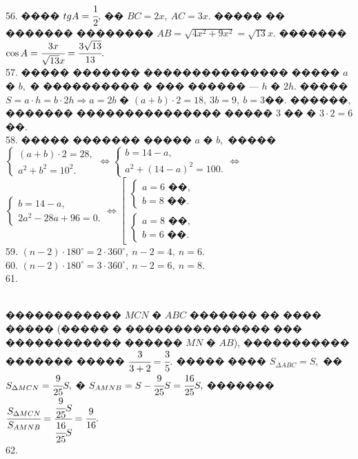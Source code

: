 \documentclass[12pt]{article}
\begin{document}
56. ���� $tg A=\cfrac{1}{2},$ �� $BC=2x,\ AC=3x.$ ����� �� ������� �������� $AB=\sqrt{4x^2+9x^2}=\sqrt{13}x.$ ������� $\cos A=\cfrac{3x}{\sqrt{13}x}=\cfrac{3\sqrt{13}}{13}.$\\
57. ����� ������� ��������������� ����� $a$ � $b,$ � ���������� � ��� ������ --- $h$ � $2h.$ ����� $S=a\cdot h=b\cdot 2h\Rightarrow a=2b$ � $(a+b)\cdot2=18,\ 3b=9,\ b=3$��. ������, ������� ��������������� ����� 3 �� � $3\cdot2=6$��.\\
58. ����� ������� ����� $a$ � $b,$ ����� $\begin{cases}(a+b)\cdot2=28,\\ a^2+b^2=10^2.\end{cases}\Leftrightarrow
\begin{cases}b=14-a,\\ a^2+(14-a)^2=100.\end{cases}\Leftrightarrow$\\$
\begin{cases}b=14-a,\\ 2a^2-28a+96=0.\end{cases}\Leftrightarrow
\left[\begin{array}{l}\begin{cases}a=6\text{ ��},\\ b=8\text{ ��}.\end{cases}\\ \begin{cases}a=8\text{ ��},\\ b=6\text{ ��}.\end{cases}\end{array}\right.$\\
59. $(n-2)\cdot180^\circ=2\cdot360^\circ,\ n-2=4,\ n=6.$\\
60. $(n-2)\cdot180^\circ=3\cdot360^\circ,\ n-2=6,\ n=8.$\\
61. \begin{figure}[ht!]
\end{figure}\\
������������ $MCN$ � $ABC$ ������� �� ���� ����� (����� � ��������������� ��� ������������ ������ $MN$ � $AB$), ����������� ������� ����� $\cfrac{3}{3+2}=\cfrac{3}{5}.$ ����� ���� $S_{\Delta ABC}=S,$ �� $S_{\Delta MCN}=\cfrac{9}{25}S,$ � $S_{AMNB}=S-\cfrac{9}{25}S=\cfrac{16}{25}S,$ ������� $\cfrac{S_{\Delta MCN}}{S_{AMNB}}=\cfrac{\cfrac{9}{25}S}{\cfrac{16}{25}S}=\cfrac{9}{16}.$\\
62. \begin{figure}[ht!]
\end{figure}\\
\end{document}
